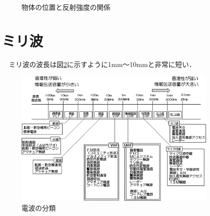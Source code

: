 \begin{figure}[H]
	\caption{物体の位置と反射強度の関係}
	\label{fig:RADAR_Demo}
\end{figure}


\section{ミリ波}
　ミリ波の波長は図\ref{fig:ClassificationOfRadioWaves}に示すように1mm～10mmと非常に短い．
\begin{figure}[H]
    \centering
    \includegraphics[width=10cm]{./fig/ClassificationOfRadioWaves.png}
    \caption{電波の分類\cite{soumu_RadioWaves}}
    \label{fig:ClassificationOfRadioWaves}
\end{figure}

